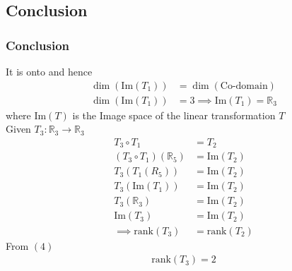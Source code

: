 \documentclass{beamer}
\providecommand{\brak}[1]{\ensuremath{\left(#1\right)}}
\theoremstyle{remark}
\numberwithin{equation}{section}
\begin{document}
\subsection{Conclusion}
\begin{frame}
\frametitle{Conclusion}
It is onto and hence
\begin{align}
   \dim\brak{\text{Im}\brak{T_1}}&= \dim\brak{\text{Co-domain}} \\
   \dim\brak{\text{Im}\brak{T_1}}&= 3 \implies \text{Im}\brak{T_1}=\mathbb{R}_3
\end{align}
where $\text{Im}\brak{T}$ is the Image space of the linear transformation $T$ \\
Given $T_3 : \mathbb{R}_3 \rightarrow \mathbb{R}_3 $ 
\begin{align}
    T_3 \circ T_1 &= T_2\\
   \brak{ T_3 \circ T_1}\brak{\mathbb{R}_5} &= \text{Im}\brak{T_2} \\
   T_3 \brak{T_1\brak{R_5}} &= \text{Im}\brak{T_2} \\
   T_3 \brak{\text{Im}\brak{T_1}} &= \text{Im}\brak{T_2} \\
   T_3 \brak{\mathbb{R}_3} &= \text{Im}\brak{T_2} \\
   \text{Im}\brak{T_3} &= \text{Im}\brak{T_2} \\
   \implies  \text{rank}(T_3) &= \text{rank}(T_2)
\end{align}
From \brak{4}
\begin{align}
    \text{rank}(T_3)=2
\end{align}
 \end{frame}
\end{document}
